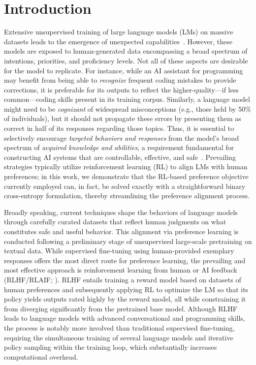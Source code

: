 \section{Introduction}
Extensive unsupervised training of large language models (LMs) on massive datasets leads to the emergence of unexpected capabilities~\citep{chowdhery2022palm, brown2020language, touvron2023llama,bubeck2023sparks}. However, these models are exposed to human-generated data encompassing a broad spectrum of intentions, priorities, and proficiency levels. Not all of these aspects are desirable for the model to replicate. For instance, while an AI assistant for programming may benefit from being able to \textit{recognize} frequent coding mistakes to provide corrections, it is preferable for its outputs to reflect the higher-quality—if less common—coding skills present in its training corpus. Similarly, a language model might need to be \textit{cognizant} of widespread misconceptions (e.g., those held by 50\% of individuals), but it should not propagate these errors by presenting them as correct in half of its responses regarding those topics. Thus, it is essential to selectively encourage \emph{targeted behaviors and responses} from the model's broad spectrum of \textit{acquired knowledge and abilities}, a requirement fundamental for constructing AI systems that are controllable, effective, and safe~\citep{ouyang2022training}. Prevailing strategies typically utilize reinforcement learning (RL) to align LMs with human preferences; in this work, we demonstrate that the RL-based preference objective currently employed can, in fact, be solved exactly with a straightforward binary cross-entropy formulation, thereby streamlining the preference alignment process.

Broadly speaking, current techniques shape the behaviors of language models through carefully curated datasets that reflect human judgments on what constitutes safe and useful behavior. This alignment via preference learning is conducted following a preliminary stage of unsupervised large-scale pretraining on textual data. While supervised fine-tuning using human-provided exemplary responses offers the most direct route for preference learning, the prevailing and most effective approach is reinforcement learning from human or AI feedback (RLHF/RLAIF; \citep{christiano2017deep,bai2022constitutional}). RLHF entails training a reward model based on datasets of human preferences and subsequently applying RL to optimize the LM so that its policy yields outputs rated highly by the reward model, all while constraining it from diverging significantly from the pretrained base model. Although RLHF leads to language models with advanced conversational and programming skills, the process is notably more involved than traditional supervised fine-tuning, requiring the simultaneous training of several language models and iterative policy sampling within the training loop, which substantially increases computational overhead.

